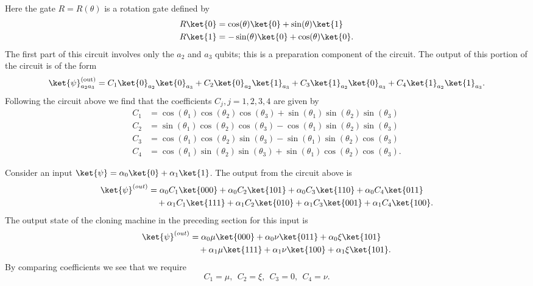 \documentclass[reqno]{amsart}
\numberwithin{lemma}{section}
\numberwithin{proposition}{section}
\begin{document}
Here the gate $R = R(\theta)$ is a rotation gate defined by
\begin{align*}
    R\ket{0} &= \cos(\theta) \ket{0} + \sin(\theta) \ket{1}\\
    R\ket{1} &= -\sin(\theta) \ket{0} + \cos(\theta) \ket{0}.
\end{align*}
The first part of this circuit involves only the $a_{2}$ and $a_{3}$ qubits; this is a preparation component of the circuit. The output of this portion of the circuit is of the form
\begin{equation*}
    \ket{\psi}_{a_{2} a_{3}}^{\textnormal{(out)}} = C_{1} \ket{0}_{a_{2}} \ket{0}_{a_{3}} + C_{2} \ket{0}_{a_{2}} \ket{1}_{a_{3}} + C_{3} \ket{1}_{a_{2}} \ket{0}_{a_{3}} + C_{4} \ket{1}_{a_{2}} \ket{1}_{a_{3}}.
\end{equation*}
Following the circuit above we find that the coefficients $C_{j}, j=1,2,3,4$ are given by
\begin{align*}
    C_{1} &= \cos(\theta_{1}) \cos(\theta_{2}) \cos(\theta_{3}) + \sin(\theta_{1}) \sin(\theta_{2}) \sin(\theta_{3})\\
    C_{2} &= \sin(\theta_{1}) \cos(\theta_{2}) \cos(\theta_{3}) - \cos(\theta_{1}) \sin(\theta_{2}) \sin(\theta_{3})\\
    C_{3} &= \cos(\theta_{1}) \cos(\theta_{2}) \sin(\theta_{3}) - \sin(\theta_{1}) \sin(\theta_{2}) \cos(\theta_{3})\\
    C_{4} &= \cos(\theta_{1}) \sin(\theta_{2}) \sin(\theta_{3}) + \sin(\theta_{1}) \cos(\theta_{2}) \cos(\theta_{3}).
\end{align*}

Consider an input $\ket{\psi} = \alpha_{0} \ket{0} + \alpha_{1} \ket{1}$. The output from the circuit above is
\begin{align*}
    \ket{\psi}^{(out)} &= \alpha_{0} C_{1} \ket{000} + \alpha_{0} C_{2} \ket{101} + \alpha_{0} C_{3} \ket{110} + \alpha_{0} C_{4} \ket{011} \\
    & \quad + \alpha_{1} C_{1} \ket{111} + \alpha_{1} C_{2} \ket{010} + \alpha_{1} C_{3} \ket{001} + \alpha_{1} C_{4} \ket{100}.
\end{align*}
The output state of the cloning machine in the preceding section for this input is
\begin{align*}
    \ket{\psi}^{(out)} &= \alpha_{0} \mu \ket{000} + \alpha_{0} \nu \ket{011} + \alpha_{0} \xi \ket{101} \\
    & \quad + \alpha_{1} \mu \ket{111} + \alpha_{1} \nu \ket{100} + \alpha_{1} \xi \ket{101}.
\end{align*}
By comparing coefficients we see that we require
\begin{equation*}
    C_{1} = \mu, \ \ C_{2} = \xi, \ \ C_{3} = 0, \ \ C_{4} = \nu.
\end{equation*}
\end{document}
